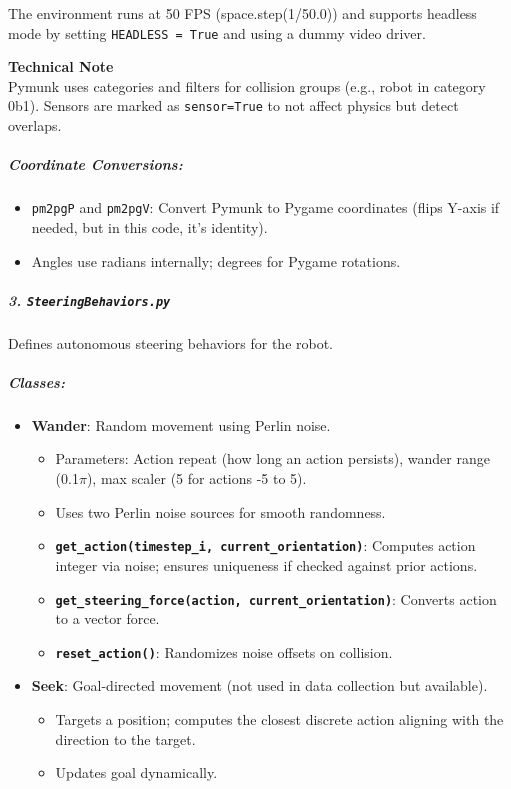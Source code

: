 The environment runs at 50 FPS (space.step(1/50.0)) and supports headless mode by setting \texttt{HEADLESS = True} and using a dummy video driver.

\begin{framed}
\textbf{Technical Note}\\
Pymunk uses categories and filters for collision groups (e.g., robot in category 0b1). Sensors are marked as \texttt{sensor=True} to not affect physics but detect overlaps.
\end{framed}

\subparagraph{Coordinate Conversions:}

\begin{itemize}
\item \texttt{pm2pgP} and \texttt{pm2pgV}: Convert Pymunk to Pygame coordinates (flips Y-axis if needed, but in this code, it's identity).
\item Angles use radians internally; degrees for Pygame rotations.
\end{itemize}

\subparagraph{3. \texttt{SteeringBehaviors.py}}

Defines autonomous steering behaviors for the robot.

\subparagraph{Classes:}

\begin{itemize}
\item \textbf{Wander}: Random movement using Perlin noise.

\begin{itemize}
\item Parameters: Action repeat (how long an action persists), wander range (0.1$\pi$), max scaler (5 for actions -5 to 5).
\item Uses two Perlin noise sources for smooth randomness.
\item \textbf{\texttt{get\_action(timestep\_i, current\_orientation)}}: Computes action integer via noise; ensures uniqueness if checked against prior actions.
\item \textbf{\texttt{get\_steering\_force(action, current\_orientation)}}: Converts action to a vector force.
\item \textbf{\texttt{reset\_action()}}: Randomizes noise offsets on collision.
\end{itemize}


\item \textbf{Seek}: Goal-directed movement (not used in data collection but available).

\begin{itemize}
\item Targets a position; computes the closest discrete action aligning with the direction to the target.
\item Updates goal dynamically.
\end{itemize}
\end{itemize}

